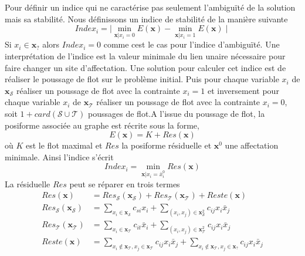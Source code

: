 \documentclass[../main/These_Mathias_Paget.tex]{subfiles}
\begin{document}
Pour définir un indice qui ne caractérise pas seulement l’ambiguïté de la solution mais sa stabilité. Nous définissons un indice de stabilité de la manière suivante
\begin{equation}
Index_i = \mid \min_{\boldsymbol{x} | x_i =0}{E(\boldsymbol{x})} - \min_{\boldsymbol{x} | x_i =1}{E(\boldsymbol{x}) \mid}
\end{equation}
Si $x_i \in \boldsymbol{x}_{?}$ alors $Index_i=0$ comme cest le cas pour l'indice d’ambiguïté. Une interprétation de l'indice est la valeur minimale du lien unaire nécessaire pour faire changer un site d'affectation. Une solution pour calculer cet indice est de réaliser le poussage de flot sur le problème initial. Puis pour chaque variable $x_i$ de $\boldsymbol{x}_\mathcal{S}$ réaliser un poussage de flot avec la contrainte $x_i=1$ et inversement pour chaque variable $x_i$ de $\boldsymbol{x}_\mathcal{T}$ réaliser un poussage de flot avec la contrainte $x_i=0$, soit $1+card(\mathcal{S} \cup \mathcal{T})$ poussages de flot.A l'issue du poussage de flot, la posiforme associée au graphe est récrite sous la forme,
\begin{equation}
			E(\boldsymbol{x})= K + Res(\boldsymbol{x})
\end{equation}
où $K$ est le flot maximal et $Res$ la posiforme résiduelle et $\boldsymbol{x}^0$ une affectation minimale. Ainsi l'indice s'écrit
\begin{equation}
Index_i = \min_{\boldsymbol{x} | x_i = \bar{x}^{0}_i}{Res(\boldsymbol{x})}
\end{equation}
La résiduelle $Res$ peut se réparer en trois termes
\begin{equation}
\begin{aligned}
			Res(\boldsymbol{x}) & = Res_\mathcal{S}(\boldsymbol{x}_\mathcal{S}) + Res_\mathcal{T}(\boldsymbol{x}_\mathcal{T}) + Reste(\boldsymbol{x}) \\
			Res_\mathcal{S}(\boldsymbol{x}_\mathcal{S}) &= \sum_{x_i \in \boldsymbol{x}_\mathcal{S}}{c_{si}x_i} + \sum_{(x_i,x_j) \in \boldsymbol{x}^{2}_\mathcal{S}}{ c_{ij}x_i\bar{x}_j} \\
			Res_\mathcal{T}(\boldsymbol{x}_\mathcal{T}) &=\sum_{x_i \in \boldsymbol{x}_\mathcal{T}}{c_{it}\bar{x}_i} + \sum_{(x_i,x_j) \in \boldsymbol{x}^{2}_\mathcal{T}}{ c_{ij}x_i\bar{x}_j} \\
			Reste(\boldsymbol{x}) &= \sum_{ x_i \not\in \boldsymbol{x}_\mathcal{T}, x_j \in \boldsymbol{x}_\mathcal{T}}{ c_{ij}x_i\bar{x}_j} + \sum_{ x_i \not\in \boldsymbol{x}_\mathcal{T}, x_j \in \boldsymbol{x}_\mathcal{?} }{ c_{ij}x_i\bar{x}_j}
\end{aligned}
\end{equation}
\end{document}
